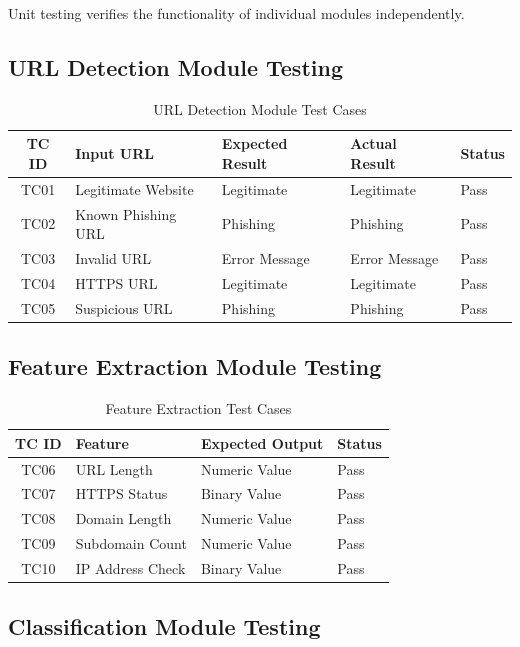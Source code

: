 \documentclass[12pt]{report}
\begin{document}
Unit testing verifies the functionality of individual modules independently.

\subsection{URL Detection Module Testing}

\begin{table}[H]
\centering
\caption{URL Detection Module Test Cases}
\begin{tabular}{|c|p{3cm}|p{2cm}|p{2cm}|p{2cm}|}
\hline
TC ID & Input URL & Expected Result & Actual Result & Status \\
\hline
TC01 & Legitimate Website & Legitimate & Legitimate & Pass \\
\hline
TC02 & Known Phishing URL & Phishing & Phishing & Pass \\
\hline
TC03 & Invalid URL & Error Message & Error Message & Pass \\
\hline
TC04 & HTTPS URL & Legitimate & Legitimate & Pass \\
\hline
TC05 & Suspicious URL & Phishing & Phishing & Pass \\
\hline
\end{tabular}
\end{table}

\subsection{Feature Extraction Module Testing}

\begin{table}[H]
\centering
\caption{Feature Extraction Test Cases}
\begin{tabular}{|c|p{4cm}|p{2cm}|p{2cm}|}
\hline
TC ID & Feature & Expected Output & Status \\
\hline
TC06 & URL Length & Numeric Value & Pass \\
\hline
TC07 & HTTPS Status & Binary Value & Pass \\
\hline
TC08 & Domain Length & Numeric Value & Pass \\
\hline
TC09 & Subdomain Count & Numeric Value & Pass \\
\hline
TC10 & IP Address Check & Binary Value & Pass \\
\hline
\end{tabular}
\end{table}

\subsection{Classification Module Testing}
\end{document}
